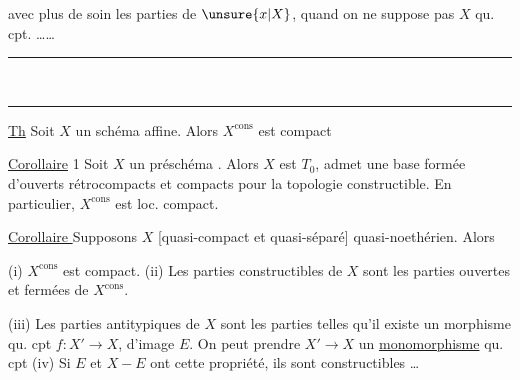  avec plus de soin les parties   de $\unsure{x|X}$, quand on ne suppose pas $X$ qu. cpt. \ldots\ldots

\begin{center}\rule{1.3cm}{0.4pt}\\[-3pt]\rule{.85cm}{0.4pt}\end{center}

\uline{Th} Soit $X$ un schéma affine. Alors $X^{\mathrm{cons}}$ est compact

\uline{Corollaire} 1 Soit $X$ un préschéma .  Alors $X$ est $T_0$, admet une base formée d'ouverts rétrocompacts et compacts pour la topologie constructible. En particulier, $X^{\mathrm{cons}}$ est loc. compact.

\uline{Corollaire } Supposons  $X$ [quasi-compact et quasi-séparé]  quasi-noethérien. Alors

(i) $X^{\mathrm{cons}}$ est compact. (ii) Les parties constructibles de $X$ sont les parties ouvertes et fermées de $X^{\mathrm{cons}}$.

(iii) Les parties  antitypiques de $X$ sont les parties  telles qu'il existe un morphisme qu. cpt $f:X'\to X$, d'image $E$. On peut prendre   $X'\to X$ un \uline{monomorphisme} \deleted{[\unsure{N.B. ce sont}} qu. cpt  (iv) Si $E$ et $X-E$ ont cette propriété, ils sont constructibles \ldots
